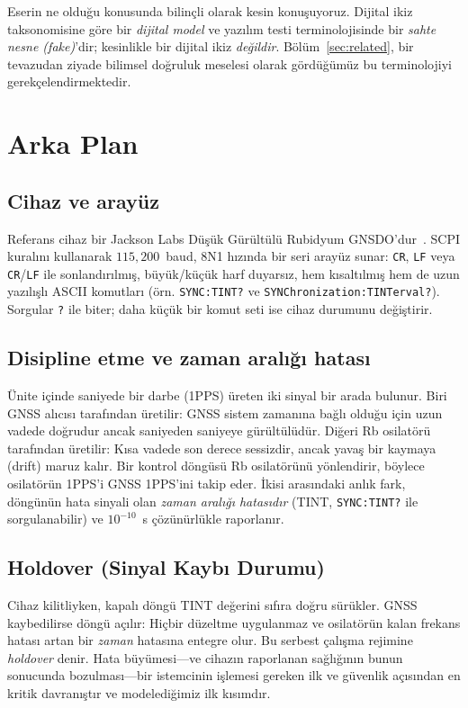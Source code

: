 \documentclass[9pt,twocolumn,a4paper]{extarticle}
\begin{document}
Eserin ne olduğu konusunda bilinçli olarak kesin konuşuyoruz. Dijital ikiz taksonomisine göre bir \emph{dijital model} ve yazılım testi terminolojisinde bir \emph{sahte nesne (fake)}'dir; kesinlikle bir dijital ikiz \emph{değildir}. Bölüm~\ref{sec:related}, bir tevazudan ziyade bilimsel doğruluk meselesi olarak gördüğümüz bu terminolojiyi gerekçelendirmektedir.

\section{Arka Plan}
\label{sec:background}
\subsection{Cihaz ve arayüz}
Referans cihaz bir Jackson Labs Düşük Gürültülü Rubidyum GNSDO'dur~\cite{jacksonlabs2015lnrb}. SCPI kuralını kullanarak $115{,}200$~baud, 8N1 hızında bir seri arayüz sunar: \texttt{CR}, \texttt{LF} veya \texttt{CR}/\texttt{LF} ile sonlandırılmış, büyük/küçük harf duyarsız, hem kısaltılmış hem de uzun yazılışlı ASCII komutları (örn. \texttt{SYNC:TINT?} ve \texttt{SYNChronization:TINTerval?}). Sorgular \texttt{?} ile biter; daha küçük bir komut seti ise cihaz durumunu değiştirir.

\subsection{Disipline etme ve zaman aralığı hatası}
Ünite içinde saniyede bir darbe (1PPS) üreten iki sinyal bir arada bulunur. Biri GNSS alıcısı tarafından üretilir: GNSS sistem zamanına bağlı olduğu için uzun vadede doğrudur ancak saniyeden saniyeye gürültülüdür. Diğeri Rb osilatörü tarafından üretilir: Kısa vadede son derece sessizdir, ancak yavaş bir kaymaya (drift) maruz kalır. Bir kontrol döngüsü Rb osilatörünü yönlendirir, böylece osilatörün 1PPS'i GNSS 1PPS'ini takip eder. İkisi arasındaki anlık fark, döngünün hata sinyali olan \emph{zaman aralığı hatasıdır} (TINT, \texttt{SYNC:TINT?} ile sorgulanabilir) ve $10^{-10}$~s çözünürlükle raporlanır.

\subsection{Holdover (Sinyal Kaybı Durumu)}
Cihaz kilitliyken, kapalı döngü TINT değerini sıfıra doğru sürükler. GNSS kaybedilirse döngü açılır: Hiçbir düzeltme uygulanmaz ve osilatörün kalan frekans hatası artan bir \emph{zaman} hatasına entegre olur. Bu serbest çalışma rejimine \emph{holdover} denir. Hata büyümesi---ve cihazın raporlanan sağlığının bunun sonucunda bozulması---bir istemcinin işlemesi gereken ilk ve güvenlik açısından en kritik davranıştır ve modelediğimiz ilk kısımdır.
\end{document}

